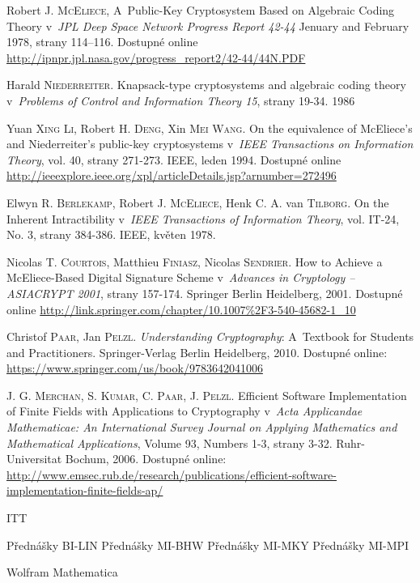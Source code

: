 \documentclass[thesis=M,czech,hidelinks]{FITthesis}[2012/06/26]
\newcommand{\0}{{\textcolor[gray]{0.80}{0}}}
\begin{document}
%
%
\begin{thebibliography}{99}

        Robert J. \textsc{McEliece}, A~Public-Key Cryptosystem Based on
        Algebraic Coding Theory v~\emph{JPL Deep Space Network Progress Report
        42-44} Jenuary and February 1978, strany 114–116. Dostupné online
        \url{http://ipnpr.jpl.nasa.gov/progress_report2/42-44/44N.PDF}

        Harald \textsc{Niederreiter}. Knapsack-type cryptosystems and
        algebraic coding theory v~\emph{Problems of Control and Information
        Theory 15}, strany 19-34. 1986

        Yuan \textsc{Xing Li}, Robert H. \textsc{Deng}, Xin \textsc{Mei Wang}.
        On the equivalence of McEliece's and Niederreiter's public-key
        cryptosystems v~\emph{IEEE Transactions on Information Theory}, vol. 40,
        strany 271-273. IEEE, leden 1994. Dostupné online
        \url{http://ieeexplore.ieee.org/xpl/articleDetails.jsp?arnumber=272496}

        Elwyn R. \textsc{Berlekamp}, Robert J. \textsc{McEliece}, Henk C. A. van
        \textsc{Tilborg}.  On the Inherent Intractibility v~\emph{IEEE
        Transactions of Information Theory}, vol. IT-24, No. 3, strany 384-386.
        IEEE, květen 1978.

        Nicolas T. \textsc{Courtois}, Matthieu \textsc{Finiasz}, Nicolas
        \textsc{Sendrier}. How to Achieve a McEliece-Based Digital Signature
        Scheme v~\emph{Advances in Cryptology -- ASIACRYPT 2001}, strany
        157-174. Springer Berlin Heidelberg, 2001. Dostupné online
        \url{http://link.springer.com/chapter/10.1007\%2F3-540-45682-1\_10}

        Christof \textsc{Paar}, Jan \textsc{Pelzl}. \emph{Understanding
        Cryptography}: A~Textbook for Students and Practitioners.
        Springer-Verlag Berlin Heidelberg, 2010. Dostupné
        online: \url{https://www.springer.com/us/book/9783642041006}

        J. G. \textsc{Merchan}, S. \textsc{Kumar}, C. \textsc{Paar},
        J. \textsc{Pelzl}. Efficient Software Implementation of Finite
        Fields with Applications to Cryptography v~\emph{Acta Applicandae
        Mathematicae: An International Survey Journal on Applying Mathematics
        and Mathematical Applications}, Volume 93, Numbers 1-3, strany  3-32.
        Ruhr-Universitat Bochum, 2006. Dostupné online:
        \url{http://www.emsec.rub.de/research/publications/efficient-software-implementation-finite-fields-ap/}

     ITT

     Přednášky BI-LIN
     Přednášky MI-BHW
     Přednášky MI-MKY
     Přednášky MI-MPI

     Wolfram Mathematica
\end{thebibliography}
\end{document}
